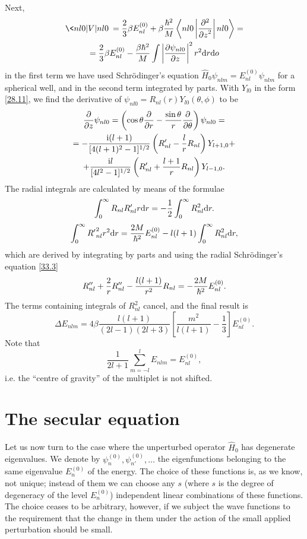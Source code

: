 {Next,
\begin{multline*}
\< nl0|V|nl0\>=\frac{2}{3}\beta E_{nl}^{(0)}+\beta\frac{\h^2}{M}\left\langle nl0\left|\frac{\p^2}{{\p z}^2}\right| nl0\right\rangle=\\
=\frac{2}{3}\beta E_{nl}^{(0)}-\frac{\beta\h^2}{M}\int\left|\frac{\p\psi_{nl0}}{\p z}\right|^2r^2\d r\d o
\end{multline*}
in the first term we have used Schr\"odinger’s equation $ \hat{H}_0\psi_{nlm} = E_{nl}^{(0)}\psi_{nlm} $ for a spherical well, and in the second term integrated by parts. With $ Y_{l0} $ in the form \eqref{28.11}, we find the derivative of $ \psi_{nl0} = R_{nl}(r) Y_{l0} (\theta, \phi) $ to be
\begin{multline*}
\frac{\partial}{\partial z}\psi_{nl0}=\left(\cos\theta\frac{\partial}{\partial r}-\frac{\sin\theta}{r}\frac{\partial}{\partial \theta} \right)\psi_{nl0}=\\
=-\frac{\mathrm{i}(l+1)}{[4(l+1)^2-1]^{1/2}}\left(R_{nl}'-\frac{l}{r}R_{nl} \right)Y_{l+1,0}+\\
+\frac{\mathrm{i} l}{[4l^2-1]^{1/2}}\left(R_{nl}'+\frac{l+1}{r}R_{nl} \right)Y_{l-1,0}.
\end{multline*}
The radial integrals are calculated by means of the formulae
\[ \int_{0}^{\infty}R_{nl}R_{nl}'r\mathrm{d} r=-\frac{1}{2}\int_{0}^{\infty}R_{nl}^2\mathrm{d} r. \]
\[ \int_0^{\infty}{R'}_{nl}^2r^2\mathrm{d} r=\frac{2M}{\hbar^2}E_{nl}^{(0)}-l(l+1)\int_0^\infty R_{nl}^2\mathrm{d} r, \]
which are derived by integrating by parts and using the radial Schrödinger’s equation \eqref{33.3}
\[ R_{nl}''+\frac{2}{r}R_{nl}''-\frac{l(l+1)}{r^2}R_{nl}=-\frac{2M}{\hbar^2}E_{nl}^{(0)}. \]
The terms containing integrals of $ R_{nl}^2 $ cancel, and the final result is
\[ \Delta E_{nlm}=4\beta\frac{l(l+1)}{(2l-1)(2l+3)}\left[\frac{m^2}{l(l+1)}-\frac{1}{3} \right]E_{nl}^{(0)}. \]
Note that
\[ \frac{1}{2l+1}\sum_{m=-l}^{l}E_{nlm}=E_{nl}^{(0)}, \]
i.e. the “centre of gravity” of the multiplet is not shifted.
}
\section{The secular equation}\label{The secular equation}
Let us now turn to the case where the unperturbed operator $ \hat{H}_0 $ has degenerate eigenvalues. We denote by $ \psi_n^{(0)}, \psi_{n'}^{(0)}, \dots $ the eigenfunctions belonging to the same eigenvalue $ E_n^{(0)} $ of the energy. The choice of these functions is, as we know, not unique; instead of them we can choose any $ s $ (where $ s $ is the degree of degeneracy of the level $ E_n^{(0)} $) independent linear combinations of these functions. The choice ceases to be arbitrary, however, if we subject the wave functions to the requirement that the change in them under the action of the small applied perturbation should be small.


